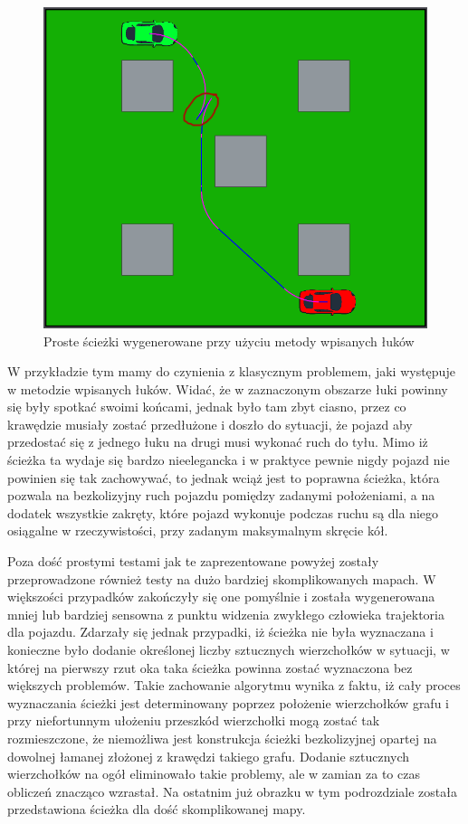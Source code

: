 \documentclass[a4paper,11pt,twoside]{report}
\theoremstyle{definition}
\begin{document}
\begin{figure}[h!]
\centering
\includegraphics[scale=0.6]{simplePath3}
\caption[Proste ścieżki wygenerowane przy użyciu metody wpisanych łuków]{Proste ścieżki wygenerowane przy użyciu metody wpisanych łuków}
\end{figure}

W przykładzie tym mamy do czynienia z klasycznym problemem, jaki występuje w metodzie wpisanych łuków. Widać, że w zaznaczonym obszarze łuki powinny się były spotkać swoimi końcami, jednak było tam zbyt ciasno, przez co krawędzie musiały zostać przedłużone i doszło do sytuacji, że pojazd aby przedostać się z jednego łuku na drugi musi wykonać ruch do tyłu. Mimo iż ścieżka ta wydaje się bardzo nieelegancka i w praktyce pewnie nigdy pojazd nie powinien się tak zachowywać, to jednak wciąż jest to poprawna ścieżka, która pozwala na bezkolizyjny ruch pojazdu pomiędzy zadanymi położeniami, a na dodatek wszystkie zakręty, które pojazd wykonuje podczas ruchu są dla niego osiągalne w rzeczywistości, przy zadanym maksymalnym skręcie kół.

Poza dość prostymi testami jak te zaprezentowane powyżej zostały przeprowadzone również testy na dużo bardziej skomplikowanych mapach. W większości przypadków zakończyły się one pomyślnie i została wygenerowana mniej lub bardziej sensowna z punktu widzenia zwykłego człowieka trajektoria dla pojazdu. Zdarzały się jednak przypadki, iż ścieżka nie była wyznaczana i konieczne było dodanie określonej liczby sztucznych wierzchołków w sytuacji, w której na pierwszy rzut oka taka ścieżka powinna zostać wyznaczona bez większych problemów. Takie zachowanie algorytmu wynika z faktu, iż cały proces wyznaczania ścieżki jest determinowany poprzez położenie wierzchołków grafu i przy niefortunnym ułożeniu przeszkód wierzchołki mogą zostać tak rozmieszczone, że niemożliwa jest konstrukcja ścieżki bezkolizyjnej opartej na dowolnej łamanej złożonej z krawędzi takiego grafu. Dodanie sztucznych wierzchołków na ogół eliminowało takie problemy, ale w zamian za to czas obliczeń znacząco wzrastał. Na ostatnim już obrazku w tym podrozdziale została przedstawiona ścieżka dla dość skomplikowanej mapy.
\end{document}
